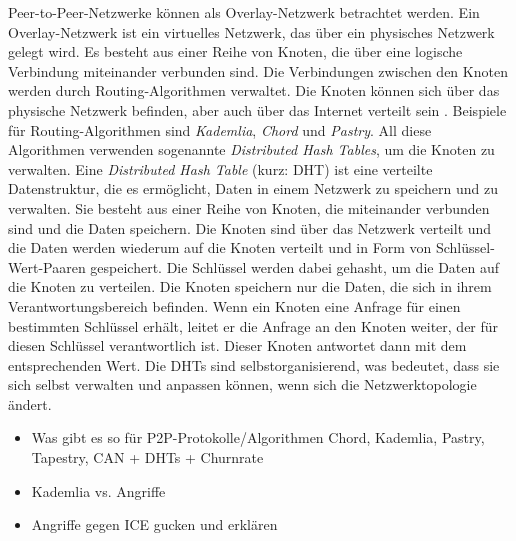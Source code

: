 Peer-to-Peer-Netzwerke können als Overlay-Netzwerk betrachtet werden. Ein Overlay-Netzwerk ist ein virtuelles Netzwerk, das über ein physisches Netzwerk gelegt wird. Es besteht aus einer Reihe von Knoten, die über eine logische Verbindung miteinander verbunden sind. Die Verbindungen zwischen den Knoten werden durch Routing-Algorithmen verwaltet. Die Knoten können sich über das physische Netzwerk befinden, aber auch über das Internet verteilt sein \parencite{Galuba_P2POverlayNetworks}. 
Beispiele für Routing-Algorithmen sind \textit{Kademlia}, \textit{Chord} und \textit{Pastry}. All diese Algorithmen verwenden sogenannte \textit{Distributed Hash Tables}, um die Knoten zu verwalten. Eine \textit{Distributed Hash Table} (kurz: DHT) ist eine verteilte Datenstruktur, die es ermöglicht, Daten in einem Netzwerk zu speichern und zu verwalten. Sie besteht aus einer Reihe von Knoten, die miteinander verbunden sind und die Daten speichern. Die Knoten sind über das Netzwerk verteilt und die Daten werden wiederum auf die Knoten verteilt und in Form von Schlüssel-Wert-Paaren gespeichert. Die Schlüssel werden dabei gehasht, um die Daten auf die Knoten zu verteilen. Die Knoten speichern nur die Daten, die sich in ihrem Verantwortungsbereich befinden. Wenn ein Knoten eine Anfrage für einen bestimmten Schlüssel erhält, leitet er die Anfrage an den Knoten weiter, der für diesen Schlüssel verantwortlich ist. Dieser Knoten antwortet dann mit dem entsprechenden Wert. Die DHTs sind selbstorganisierend, was bedeutet, dass sie sich selbst verwalten und anpassen können, wenn sich die Netzwerktopologie ändert.










\begin{itemize}
    \item Was gibt es so für P2P-Protokolle/Algorithmen Chord, Kademlia, Pastry, Tapestry, CAN + DHTs + Churnrate
    \item Kademlia vs. Angriffe
    \item Angriffe gegen ICE gucken und erklären
\end{itemize}

